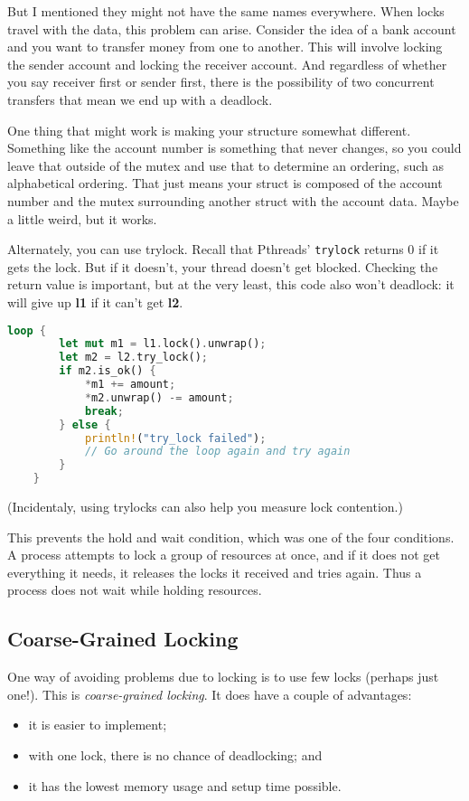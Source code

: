 But I mentioned they might not have the same names everywhere. When locks travel with the data, this problem can arise. Consider the idea of a bank account and you want to transfer money from one to another. This will involve locking the sender account and locking the receiver account. And regardless of whether you say receiver first or sender first, there is the possibility of two concurrent transfers that mean we end up with a deadlock.

One thing that might work is making your structure somewhat different. Something like the account number is something that never changes, so you could leave that outside of the mutex and use that to determine an ordering, such as alphabetical ordering. That just means your struct is composed of the account number and the mutex surrounding another struct with the account data. Maybe a little weird, but it works.

Alternately, you can use trylock. Recall that Pthreads' {\tt trylock}
returns 0 if it gets the lock. But if it doesn't, your thread doesn't get blocked. Checking the return value is important, but at the very least, this code also won't deadlock: it will give up {\bf l1} if it can't get {\bf l2}.
  \begin{lstlisting}[language=Rust]
    loop {
        let mut m1 = l1.lock().unwrap();
        let m2 = l2.try_lock();
        if m2.is_ok() {
            *m1 += amount;
            *m2.unwrap() -= amount;
            break;
        } else {
            println!("try_lock failed");
            // Go around the loop again and try again
        }
    }
  \end{lstlisting}
  (Incidentaly, using trylocks can also help you measure lock contention.)

This prevents the hold and wait condition, which was one of the four conditions. A process attempts to lock a group of resources at once, and if it does not get everything it needs, it releases the locks it received and tries again. Thus a process does not wait while holding resources.

\subsection*{Coarse-Grained Locking}
One way of avoiding problems due to locking is to use few locks
(perhaps just one!). This is \emph{coarse-grained locking}.
It does have a couple of advantages:
  \begin{itemize}
    \item it is easier to implement;
    \item with one lock, there is no chance of deadlocking; and
    \item it has the lowest memory usage and setup time possible.
  \end{itemize}

